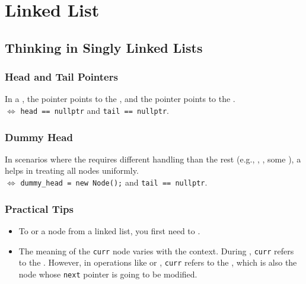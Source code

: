 \chapter{Linked List}
\section{Thinking in Singly Linked Lists}
\subsection{Head and Tail Pointers}
In a {\color{blue}{singly linked list}}, the {\color{blue}{head}} pointer points to the {\color{blue}{first node}}, and the {\color{blue}{tail}} pointer points to the {\color{blue}{last node}}. \\

{\color{blue}{A singly linked list is empty}} $\Leftrightarrow$ {\colorbox{CodeBackground}{\lstinline|head == nullptr|}} and {\colorbox{CodeBackground}{\lstinline|tail == nullptr|}}.

\subsection{Dummy Head}
In scenarios where the {\color{blue}{first node}} requires different handling than the rest (e.g., {\color{blue}{insertion}}, {\color{blue}{deletion}}, some {\color{blue}{rearranging operations}}), a {\color{blue}{dummy head}} helps in treating all nodes uniformly.\\

{\color{blue}{A singly linked list with the dummy head is empty}} $\Leftrightarrow$ {\colorbox{CodeBackground}{\lstinline|dummy_head = new Node();|}} and {\colorbox{CodeBackground}{\lstinline|tail == nullptr|}}.

\subsection{Practical Tips}
\begin{itemize}
	\item To {\color{blue}{insert}} or {\color{blue}{remove}} a node from a linked list, you first need to {\color{blue}{locate the node immediately preceding the target node}}.
	\item The meaning of the {\colorbox{CodeBackground}{\lstinline|curr|}} node varies with the context. During {\color{blue}{traversal}}, {\colorbox{CodeBackground}{\lstinline|curr|}} refers to the {\color{blue}{node currently under examination}}. However, in operations like {\color{blue}{insertion}} or {\color{blue}{deletion}}, {\colorbox{CodeBackground}{\lstinline|curr|}} refers to the {\color{blue}{node immediately preceding the target node}}, which is also the node whose {\colorbox{CodeBackground}{\lstinline|next|}} pointer is going to be modified.
\end{itemize}

